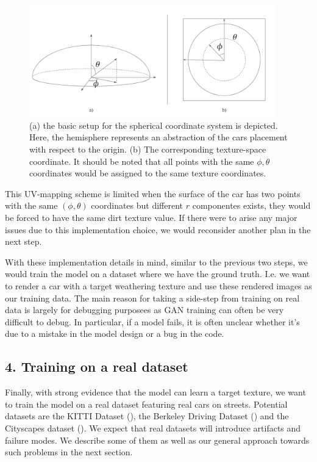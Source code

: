 \documentclass[letterpaper,doc,natbib]{apa6}
\begin{document}
\begin{figure}
\centering
\includegraphics[width=0.95\textwidth]{coordinates.png}
\caption{\label{fig:coordinates} (a) the basic setup for the spherical coordinate system is depicted. Here, the hemisphere represents an abstraction of the cars placement with respect to the origin. (b) The corresponding texture-space coordinate. It should be noted that all points with the same $\phi, \theta$ coordinates would be assigned to the same texture coordinates.}
\end{figure}

This UV-mapping scheme is limited when the surface of the car has two points with the same $(\phi, \theta)$ coordinates but different $r$ componentes exists, they would be forced to have the same dirt texture value. If there were to arise any major issues due to this implementation choice, we would reconsider another plan in the next step.

With these implementation details in mind, similar to the previous two steps, we would train the model on a dataset where we have the ground truth. I.e. we want to render a car with a target weathering texture and use these rendered images as our training data. The main reason for taking a side-step from training on real data is largely for debugging purposees as GAN training can often be very difficult to debug. In particular, if a model fails, it is often unclear whether it's due to a mistake in the model design or a bug in the code.

\subsection{4. Training on a real dataset}

Finally, with strong evidence that the model can learn a target texture, we want to train the model on a real dataset featuring real cars on streets. Potential datasets are the KITTI Dataset (\cite{kitti}), the Berkeley Driving Dataset (\cite{bdd}) and the Cityscapes dataset (\cite{cityscapes}). We expect that real datasets will introduce artifacts and failure modes. We describe some of them as well as our general approach towards such problems in the next section.
\end{document}
